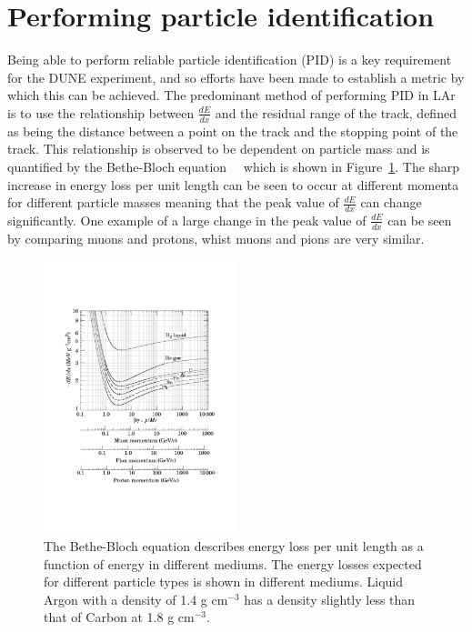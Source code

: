 \section{Performing particle identification}  \label{sec:PID} %
Being able to perform reliable particle identification (PID) is a key requirement for the DUNE experiment, and so efforts have been made to establish a metric by which this can be achieved. The predominant method of performing PID in LAr is to use the relationship between $\frac{dE}{dx}$ and the residual range of the track, defined as being the distance between a point on the track and the stopping point of the track. This relationship is observed to be dependent on particle mass and is quantified by the Bethe-Bloch equation~\citep{Bethe}~\citep{Bloch} which is shown in Figure~\ref{fig:BetheBloch}. The sharp increase in energy loss per unit length can be seen to occur at different momenta for different particle masses meaning that the peak value of $\frac{dE}{dx}$ can change significantly. One example of a large change in the peak value of $\frac{dE}{dx}$ can be seen by comparing muons and protons, whist muons and pions are very similar. \\

\begin{figure}[h!]
  \centering
  \includegraphics[width=0.5\textwidth]{BetheBlock}
  \caption[The medium and particle type dependence of the Bethe-Bloch equation]
          {The Bethe-Bloch equation describes energy loss per unit length as a function of energy in different mediums. The energy losses expected for different particle types is shown in different mediums. Liquid Argon with a density of 1.4 g cm$^{-3}$ has a density slightly less than that of Carbon at 1.8 g cm$^{-3}$.}
  \label{fig:BetheBloch}
\end{figure}

